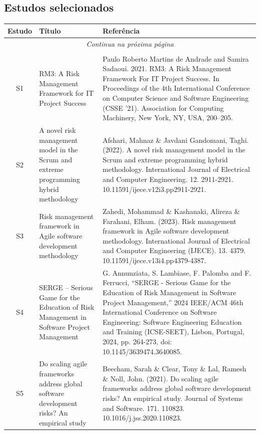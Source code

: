 \documentclass[
	12pt,
	openright,
	twoside,
	a4paper,
	english,
	brazil
	]{abntex2}
\begin{document}
\begin{apendices}
\chapter{Estudos selecionados}
\label{apendiceB}

\vspace{-2em} %

\begin{longtable}{|c|p{5.5cm}|p{7.5cm}|}
  \hline
  \textbf{Estudo} & \textbf{Título} & \textbf{Referência} \\
  \hline
  \endfirsthead
  \hline
  \multicolumn{3}{|c|}{\textit{Continua na próxima página}} \\
  \hline
  \endfoot
  \hline
  \multicolumn{3}{|c|}{\textit{Fim da tabela}} \\
  \hline
  \endlastfoot
  S1 & RM3: A Risk Management Framework for IT Project Success & Paulo Roberto Martins de Andrade and Samira Sadaoui. 2021. RM3: A Risk Management Framework For IT Project Success. In Proceedings of the 4th International Conference on Computer Science and Software Engineering (CSSE '21). Association for Computing Machinery, New York, NY, USA, 200–205. \\
  \hline
  S2 & A novel risk management model in the Scrum and extreme programming hybrid methodology & Afshari, Mahnaz \& Javdani Gandomani, Taghi. (2022). A novel risk management model in the Scrum and extreme programming hybrid methodology. International Journal of Electrical and Computer Engineering. 12. 2911-2921. 10.11591/ijece.v12i3.pp2911-2921. \\
  \hline
  S3 & Risk management framework in Agile software development methodology & Zahedi, Mohammad \& Kashanaki, Alireza \& Farahani, Elham. (2023). Risk management framework in Agile software development methodology. International Journal of Electrical and Computer Engineering (IJECE). 13. 4379. 10.11591/ijece.v13i4.pp4379-4387. \\
  \hline
  S4 & SERGE – Serious Game for the Education of Risk Management in Software Project Management & G. Annunziata, S. Lambiase, F. Palomba and F. Ferrucci, “SERGE - Serious Game for the Education of Risk Management in Software Project Management,” 2024 IEEE/ACM 46th International Conference on Software Engineering: Software Engineering Education and Training (ICSE-SEET), Lisbon, Portugal, 2024, pp. 264-273, doi: 10.1145/3639474.3640085. \\
  \hline
  S5 & Do scaling agile frameworks address global software development risks? An empirical study & Beecham, Sarah \& Clear, Tony \& Lal, Ramesh \& Noll, John. (2021). Do scaling agile frameworks address global software development risks? An empirical study. Journal of Systems and Software. 171. 110823. 10.1016/j.jss.2020.110823. \\

\end{longtable}
\end{apendices}
\end{document}
